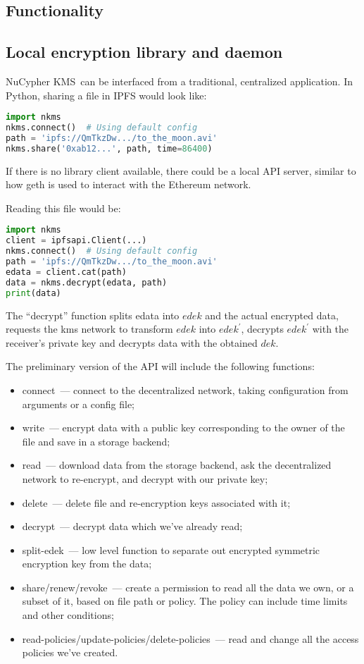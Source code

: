 \documentclass[longbibliography,nofootinbib]{revtex4-1}
\newcommand{\kms}{NuCypher KMS}
\begin{document}
\begin{CJK*}{UTF8}{gbsn}
\section{Functionality}

\subsection{Local encryption library and daemon}

\kms~can be interfaced from a traditional, centralized application.
In Python, sharing a file in IPFS would look like:
\begin{lstlisting}[frame=single,language=Python]
import nkms
nkms.connect()  # Using default config
path = 'ipfs://QmTkzDw.../to_the_moon.avi'
nkms.share('0xab12...', path, time=86400)
\end{lstlisting}
If there is no library client available, there could be a local API server, similar to how geth is used to interact with the Ethereum network.

Reading this file would be:
\begin{lstlisting}[frame=single,language=Python]
import nkms
client = ipfsapi.Client(...)
nkms.connect()  # Using default config
path = 'ipfs://QmTkzDw.../to_the_moon.avi'
edata = client.cat(path)
data = nkms.decrypt(edata, path)
print(data)
\end{lstlisting}
The ``decrypt'' function splits edata into $edek$ and the actual encrypted data,
requests the kms network to transform $edek$ into $edek^{\prime}$,
decrypts $edek^{\prime}$ with the receiver's private key and
decrypts data with the obtained $dek$.

The preliminary version of the API will include the following functions:
\begin{itemize}
    \item connect~--- connect to the decentralized network,
        taking configuration from arguments or a config file;
    \item write~--- encrypt data with a public key corresponding to the owner of the file and save in a storage backend;
    \item read~--- download data from the storage backend, ask the decentralized network to re-encrypt, and decrypt with our private key;
    \item delete~--- delete file and re-encryption keys associated with it;
    \item decrypt~--- decrypt data which we've already read;
    \item split-edek~--- low level function to separate out encrypted symmetric encryption key from the data;
    \item share/renew/revoke~--- create a permission to read all the data we own, or a subset of it, based on file path or policy.
        The policy can include time limits and other conditions;
    \item read-policies/update-policies/delete-policies~--- read and change all the access policies we've created.
\end{itemize}


\end{CJK*}
\end{document}
